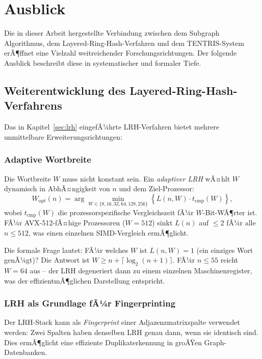 ﻿\documentclass[a4paper,12pt]{article}
\theoremstyle{definition}
\begin{document}
\section{Ausblick}
\label{sec:ausblick}

Die in dieser Arbeit hergestellte Verbindung zwischen dem Subgraph Algorithmus, dem
Layered-Ring-Hash-Verfahren und dem TENTRIS-System erÃ¶ffnet eine Vielzahl
weitreichender Forschungsrichtungen. Der folgende Ausblick beschreibt diese in
systematischer und formaler Tiefe.

\subsection{Weiterentwicklung des Layered-Ring-Hash-Verfahrens}

Das in Kapitel~\ref{sec:lrh} eingefÃ¼hrte LRH-Verfahren bietet mehrere unmittelbare
Erweiterungsrichtungen:

\subsubsection{Adaptive Wortbreite}

Die Wortbreite $W$ muss nicht konstant sein. Ein \emph{adaptiver LRH} wÃ¤hlt $W$
dynamisch in AbhÃ¤ngigkeit von $n$ und dem Ziel-Prozessor:
\[
  W_{\mathrm{opt}}(n) = \arg\min_{W \in \{8,16,32,64,128,256\}}
  \left\{ L(n,W) \cdot t_{\mathrm{cmp}}(W) \right\},
\]
wobei $t_{\mathrm{cmp}}(W)$ die prozessorspezifische Vergleichszeit fÃ¼r $W$-Bit-WÃ¶rter
ist. FÃ¼r AVX-512-fÃ¤hige Prozessoren ($W=512$) sinkt $L(n)$ auf $\leq 2$ fÃ¼r alle
$n \leq 512$, was einen einzelnen SIMD-Vergleich ermÃ¶glicht.

Die formale Frage lautet: FÃ¼r welches $W$ ist $L(n, W) = 1$ (ein einziges Wort
genÃ¼gt)? Die Antwort ist $W \geq n + \lceil \log_2(n+1) \rceil$. FÃ¼r $n \leq 55$
reicht $W=64$ aus -- der LRH degeneriert dann zu einem einzelnen Maschinenregister,
was der effizientmÃ¶glichen Darstellung entspricht.

\subsubsection{LRH als Grundlage fÃ¼r Fingerprinting}

Der LRH-Stack kann als \emph{Fingerprint} einer Adjazenzmatrixspalte verwendet werden:
Zwei Spalten haben denselben LRH genau dann, wenn sie identisch sind. Dies ermÃ¶glicht
eine effiziente Duplikaterkennung in groÃŸen Graph-Datenbanken.
\end{document}
